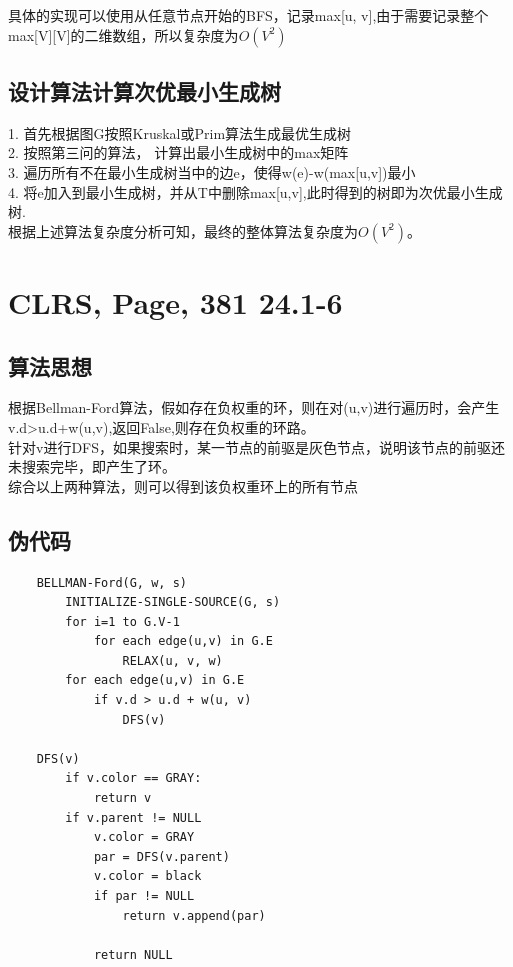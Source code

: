 \documentclass[UTF8]{ctexart}
\begin{document}
具体的实现可以使用从任意节点开始的BFS，记录max[u, v],由于需要记录整个max[V][V]的二维数组，所以复杂度为$O(V^2)$

\subsection{设计算法计算次优最小生成树}

1. 首先根据图G按照Kruskal或Prim算法生成最优生成树\\
2. 按照第三问的算法， 计算出最小生成树中的max矩阵\\
3. 遍历所有不在最小生成树当中的边e，使得w(e)-w(max[u,v])最小\\
4. 将e加入到最小生成树，并从T中删除max[u,v],此时得到的树即为次优最小生成树.\\

根据上述算法复杂度分析可知，最终的整体算法复杂度为$O(V^2)$。



\section{CLRS, Page, 381 24.1-6}

\subsection{算法思想}

根据Bellman-Ford算法，假如存在负权重的环，则在对(u,v)进行遍历时，会产生v.d>u.d+w(u,v),返回False,则存在负权重的环路。\\
针对v进行DFS，如果搜索时，某一节点的前驱是灰色节点，说明该节点的前驱还未搜索完毕，即产生了环。\\
综合以上两种算法，则可以得到该负权重环上的所有节点

\subsection{伪代码}

\begin{lstlisting}
    BELLMAN-Ford(G, w, s)
        INITIALIZE-SINGLE-SOURCE(G, s)
        for i=1 to G.V-1
            for each edge(u,v) in G.E
                RELAX(u, v, w)
        for each edge(u,v) in G.E
            if v.d > u.d + w(u, v)
                DFS(v)
    
    DFS(v)
        if v.color == GRAY:
            return v
        if v.parent != NULL
            v.color = GRAY
            par = DFS(v.parent)
            v.color = black
            if par != NULL
                return v.append(par)

            return NULL
    \end{lstlisting}
\end{document}
